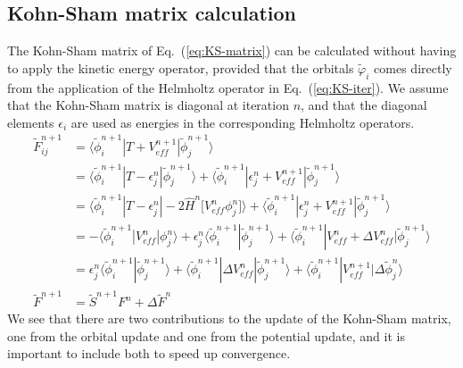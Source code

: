 \subsection{Kohn-Sham matrix calculation}
The Kohn-Sham matrix of Eq.~(\ref{eq:KS-matrix}) can be calculated without having to
apply the kinetic energy operator, provided that the orbitals $\tilde{\varphi}_i$ comes 
directly from the application of the Helmholtz operator in Eq.~(\ref{eq:KS-iter}).
We assume that the Kohn-Sham matrix is diagonal at iteration $n$, and that the diagonal
elements $\epsilon_i$ are used as energies in the corresponding Helmholtz operators.
\begin{align}
    \tilde{F}_{ij}^{n+1}
    &=	\langle\tilde{\phi}_i^{n+1} | T + V_{eff}^{n+1}              | \tilde{\phi}_j^{n+1}\rangle\\
    &=	\langle\tilde{\phi}_i^{n+1} | T - \epsilon_j^{n}             | \tilde{\phi}_j^{n+1}\rangle
    +	\langle\tilde{\phi}_i^{n+1} | \epsilon_j^{n} + V_{eff}^{n+1} | \tilde{\phi}_j^{n+1}\rangle\\
    &=	\langle\tilde{\phi}_i^{n+1} | T - \epsilon_j^{n}             | -2\hat{H}^{n}\big[V_{eff}^{n} 
	\phi_j^{n}\big]\rangle
    +	\langle\tilde{\phi}_i^{n+1} | \epsilon_j^{n} + V_{eff}^{n+1} | \tilde{\phi}_j^{n+1}\rangle\\
    &= -\langle\tilde{\phi}_i^{n+1} | V_{eff}^{n}                    | \phi_j^{n}\rangle
    +	\epsilon_j^{n}
	\langle\tilde{\phi}_i^{n+1} | \tilde{\phi}_j^{n+1}\rangle
    +	\langle\tilde{\phi}_i^{n+1} | V_{eff}^{n}+\Delta V_{eff}^{n} | \tilde{\phi}_j^{n+1}\rangle\\
    &=	\epsilon_j^{n}
	\langle\tilde{\phi}_i^{n+1} | \tilde{\phi}_j^{n+1}\rangle
    +	\langle\tilde{\phi}_i^{n+1} | \Delta V_{eff}^{n}             | \tilde{\phi}_j^{n+1}\rangle
    +	\langle\tilde{\phi}_i^{n+1} | V_{eff}^{n+1}                  | \Delta \tilde{\phi}_j^{n}\rangle\\
    \tilde{F}^{n+1}
    &=  \tilde{S}^{n+1}F^{n} + \Delta \tilde{F}^{n}
\end{align}
We see that there are two contributions to the update of the Kohn-Sham matrix, 
one from the orbital update and one from the potential update, and it is important
to include both to speed up convergence.

